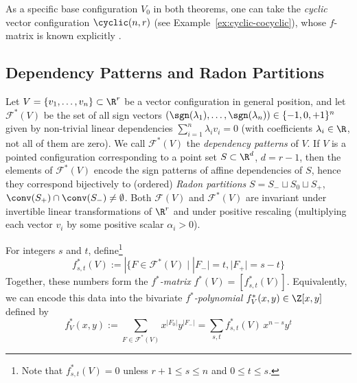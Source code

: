 %
\begin{remark}
As a specific base configuration $V_0$ in both theorems, one can take the \emph{cyclic} vector configuration $\cyclic(n,r)$ (see Example~\ref{ex:cyclic-cocyclic}), whose $f$-matrix is known explicitly \cite{Andrzejak:2003aa}. 
\end{remark}
%
%
%
%
\subsection{Dependency Patterns and Radon Partitions}
Let $V = \{ v_1, \ldots, v_n \} \subset \R^r$ be a vector configuration in general position, and let $\mathcal{F}^*(V)$ be the set of all sign vectors $(\sgn(\lambda_1),\dots,\sgn(\lambda_n)) \in \{-1,0,+1\}^n$ given by non-trivial linear dependencies $\sum_{i=1}^n \lambda_i v_i=0$ (with coefficients $\lambda_i\in \R$, not all of them are zero). We call $\mathcal{F}^*(V)$ the \emph{dependency patterns} of $V$. If $V$ is a pointed configuration corresponding to a point set $S\subset \R^d$, $d=r-1$, then the elements of $\mathcal{F}^*(V)$ encode the sign patterns of affine dependencies of $S$, hence they correspond bijectively to (ordered) \emph{Radon partitions} $S=S_-\sqcup S_0 \sqcup S_+$, $\conv(S_+) \cap \conv(S_-)\neq \emptyset$. 
%
Both $\mathcal{F}(V)$ and $\mathcal{F}^*(V)$ are invariant under invertible linear transformations of $\R^r$ and under positive rescaling (multiplying each vector $v_i$ by some positive scalar $\alpha_i>0$).
%
%
%
\begin{definition} 
\label{def:fstar-poly}
For integers $s$ and $t$, define\footnote{Note that $f^*_{s,t}(V)=0$ unless $r+1\leq s\leq n$ and $0\leq t\leq s$.%
}
\[
f^*_{s,t}(V):=|\{F\in \mathcal{F}^*(V)\mid |F_-|=t, |F_+|=s-t\}
\]
Together, these numbers form the \emph{$f^*$-matrix} $f^*(V)=[f^*_{s,t}(V)]$. Equivalently, we can encode this data into the bivariate  \emph{$f^*$-polynomial} $f^*_V(x,y) \in \Z[x,y]$ defined by 
\[
f^*_{V}(x,y) := \sum_{F\in \mathcal{F}^*(V)} x^{|F_0|} y^{|F_-|} = \sum_{s,t} f^*_{s,t}(V)\, x^{n-s} y^t
\]
\end{definition}
